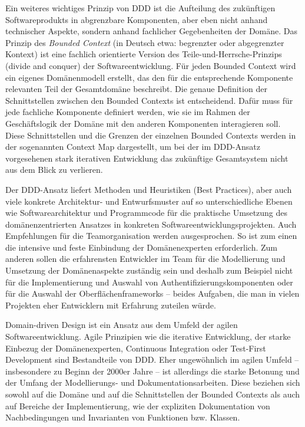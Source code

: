 Ein weiteres wichtiges Prinzip von DDD ist die Aufteilung des zukünftigen Softwareprodukts in abgrenzbare Komponenten,
aber eben nicht anhand technischer Aspekte, sondern anhand fachlicher Gegebenheiten der Domäne. Das Prinzip des \textit{Bounded Context} (in Deutsch etwa: begrenzter oder abgegrenzter Kontext) ist eine 
fachlich orientierte Version des Teile-und-Herrsche-Prinzips (divide and conquer) der Softwareentwicklung. Für jeden Bounded Context wird ein eigenes Domänenmodell erstellt, das den für die entsprechende Komponente relevanten Teil der Gesamtdomäne beschreibt. Die genaue Definition der Schnittstellen zwischen den Bounded Contexts
ist entscheidend. Dafür muss für jede fachliche Komponente definiert werden, wie sie im Rahmen der Geschäftslogik der Domäne mit den anderen Komponenten interagieren soll. Diese Schnittstellen und die Grenzen der einzelnen Bounded Contexts werden in der sogenannten Context Map dargestellt, um bei der im DDD-Ansatz vorgesehenen stark iterativen Entwicklung das zukünftige Gesamtsystem nicht aus dem Blick zu verlieren.

Der 
DDD-Ansatz liefert Methoden und Heuristiken (Best Practices), aber auch viele konkrete Architektur- und Entwurfsmuster auf so unterschiedliche Ebenen wie Softwarearchitektur und Programmcode für die praktische Umsetzung des domänenzentrierten Ansatzes in konkreten Softwareentwicklungsprojekten. Auch Empfehlungen für die Teamorganisation werden ausgesprochen. So ist zum einen die intensive und feste Einbindung der Domänenexperten erforderlich. Zum anderen sollen die erfahrensten Entwickler im Team für die Modellierung und Umsetzung der Domänenaspekte zuständig sein und deshalb zum Beispiel nicht für die Implementierung und Auswahl von Authentifizierungskomponenten oder für die Auswahl der Oberflächenframeworks – beides Aufgaben, die man in vielen Projekten eher Entwicklern mit Erfahrung zuteilen würde.

Domain-driven Design ist ein Ansatz aus dem Umfeld 
der agilen Softwareentwicklung. Agile Prinzipien wie die iterative Entwicklung, der starke Einbezug der Domänenexperten, Continuous Integration oder Test-First Development 
sind Bestandteile von DDD. Eher ungewöhnlich im agilen Umfeld – insbesondere zu Beginn der 2000er Jahre – ist allerdings die starke Betonung und der Umfang der Modellierungs- und Dokumentationsarbeiten. Diese beziehen sich sowohl auf die Domäne und auf die Schnittstellen der Bounded Contexts als auch auf Bereiche der Implementierung, 
wie der expliziten Dokumentation von Nachbedingungen und Invarianten von Funktionen bzw. Klassen. 

